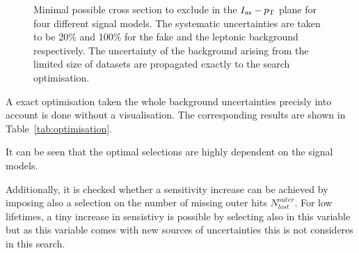 \begin{figure}[!h]
\begin{tabular}{c}
  \end{tabular}
  \caption{Minimal possible cross section to exclude in the $I_{\text{as}}-p_{\text{T}}$ plane for four different signal models.
           The systematic uncertainties are taken to be 20\% and 100\% for the fake and the leptonic background respectively.
           The uncertainty of the background arising from the limited size of datasets are propagated exactly to the search optimisation.}
  \label{fig:optimisation}
\end{figure} 
A exact optimisation taken the whole background uncertainties precisly into account is done without a visualisation.
The corresponding results are shown in Table~\ref{tab:optimisation}.

\renewcommand{\arraystretch}{1.5}
\begin{table}[!h]
\centering
\caption{Optimal \pt and \ias cuts and corresponding minimal possible cross section $\sigma_{\text{min}}$ to exclude for different signal models.}
\label{tab:optimisation}
\end{table}

It can be seen that the optimal selections are highly dependent on the signal models.

Additionally, it is checked whether a sensitivity increase can be achieved by imposing also a selection on the number of missing outer hits $N_{lost}^{outer}$.
For low lifetimes, a tiny increase in sensistivy is possible by selecting also in this variable but as this variable comes with new sources of uncertainties this is not consideres in this search.

